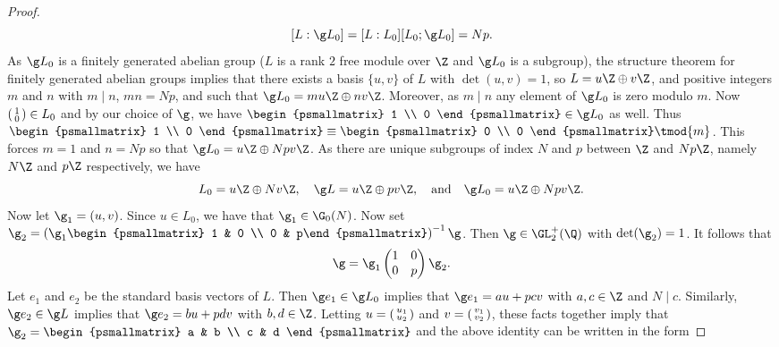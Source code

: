 \begin{proof}
      \[
        [L:\g L_{0}] = [L:L_{0}][L_{0};\g L_{0}] = Np.
      \]
      As $\g L_{0}$ is a finitely generated abelian group ($L$ is a rank $2$ free module over $\Z$ and $\g L_{0}$ is a subgroup), the structure theorem for finitely generated abelian groups implies that there exists a basis $\{u,v\}$ of $L$ with $\det(u,v) = 1$, so $L = u\Z \oplus v\Z$, and positive integers $m$ and $n$ with $m \mid n$, $mn = Np$, and such that $\g L_{0} = mu\Z \oplus nv\Z$. Moreover, as $m \mid n$ any element of $\g L_{0}$ is zero modulo $m$. Now $\begin{psmallmatrix} 1 \\ 0 \end{psmallmatrix} \in L_{0}$ and by our choice of $\g$, we have $\begin{psmallmatrix} 1 \\ 0 \end{psmallmatrix} \in \g L_{0}$ as well. Thus $\begin{psmallmatrix} 1 \\ 0 \end{psmallmatrix} \equiv \begin{psmallmatrix} 0 \\ 0 \end{psmallmatrix} \tmod{m}$. This forces $m = 1$ and $n = Np$ so that $\g L_{0} = u\Z \oplus Npv\Z$. As there are unique subgroups of index $N$ and $p$ between $\Z$ and $Np\Z$, namely $N\Z$ and $p\Z$ respectively, we have
      \[
        L_{0} = u\Z \oplus Nv\Z, \quad \g L = u\Z \oplus pv\Z, \quad \text{and} \quad \g L_{0} = u\Z \oplus Npv\Z.
      \]
      Now let $\g_{1} = (u,v)$. Since $u \in L_{0}$, we have that $\g_{1} \in \G_{0}(N)$. Now set $\g_{2} = \left(\g_{1}\begin{psmallmatrix} 1 & 0 \\ 0 & p\end{psmallmatrix}\right)^{-1}\g$. Then $\g \in \GL_{2}^{+}(\Q)$ with $\det(\g_{2}) = 1$. It follows that
      \[
        \g = \g_{1}\begin{pmatrix} 1 & 0 \\ 0 & p\end{pmatrix}\g_{2}.
      \]
      Let $e_{1}$ and $e_{2}$ be the standard basis vectors of $L$. Then $\g e_{1} \in \g L_{0}$ implies that $\g e_{1} = au+pcv$ with $a,c \in \Z$ and $N \mid c$. Similarly, $\g e_{2} \in \g L$ implies that $\g e_{2} = bu+pdv$ with $b,d \in \Z$. Letting $u = \begin{psmallmatrix} u_{1} \\ u_{2} \end{psmallmatrix}$ and $v = \begin{psmallmatrix} v_{1} \\ v_{2} \end{psmallmatrix}$, these facts together imply that $\g_{2} = \begin{psmallmatrix} a & b \\ c & d \end{psmallmatrix}$ and the above identity can be written in the form

\end{proof}
